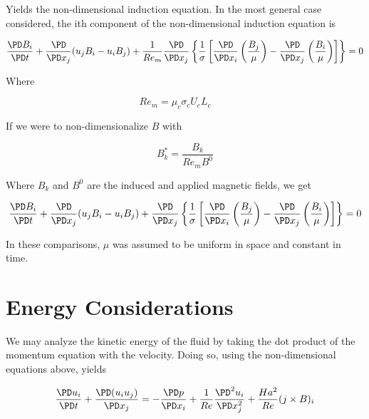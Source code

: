 \documentclass[11pt]{article}
\begin{document}
Yields the non-dimensional induction equation. In the most general case considered, the ith component of the non-dimensional induction equation is

\begin{equation}
	\frac{\PD B_i}{\PD t}
	+ \frac{\PD}{\PD x_j} (u_j B_i - u_i B_j)
	+ \frac{1}{Re_m}
	\frac{\PD}{\PD x_j}
	\left\{ \frac{1}{\sigma}
	\left[
	\frac{\PD}{\PD x_i}
	\left( \frac{B_j}{\mu} \right) -
	\frac{\PD}{\PD x_j}
	\left( \frac{B_i}{\mu} \right)
	\right]
	\right\} = 0
\end{equation}

Where

\begin{equation}
	Re_m = \mu_c \sigma_c U_c L_c \qquad
\end{equation}

If we were to non-dimensionalize $B$ with

\begin{equation}
	B_k^* = \frac{B_k}{Re_m B^0}
\end{equation}

Where $B_k$ and $B^0$ are the induced and applied magnetic fields, we get

\begin{equation}
	\frac{\PD B_i}{\PD t}
	+ \frac{\PD}{\PD x_j} (u_j B_i - u_i B_j)
	+
	\frac{\PD}{\PD x_j}
	\left\{ \frac{1}{\sigma}
	\left[
	\frac{\PD}{\PD x_i}
	\left( \frac{B_j}{\mu} \right) -
	\frac{\PD}{\PD x_j}
	\left( \frac{B_i}{\mu} \right)
	\right]
	\right\} = 0
\end{equation}


In these comparisons, $\mu$ was assumed to be uniform in space and constant in time.


\section{Energy Considerations}
We may analyze the kinetic energy of the fluid by taking the dot product of the momentum equation with the velocity. Doing so, using the non-dimensional equations above, yields

\begin{equation}
	\frac{\PD u_i}{\PD t} +
	\frac{\PD (u_i u_j)}{\PD x_j}
	=
	- \frac{\PD p}{\PD x_i}
	+ \frac{1}{Re}
	\frac{\PD^2 u_i}{\PD x_j^2}
	+ \frac{Ha^2}{Re}
	(j \times B)_i
\end{equation}
\end{document}
